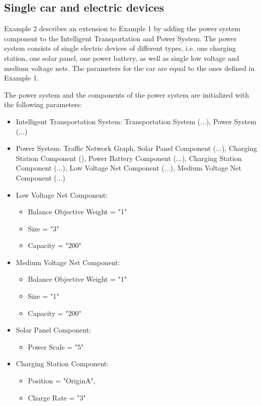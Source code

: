 \subsection{Single car and electric devices}
Example 2 describes an extension to Example 1 by adding the power system component to the Intelligent Transportation and Power System. The power system consists of single electric devices of different types, i.e. one charging station, one solar panel, one power battery, as well as single low voltage and medium voltage nets. The parameters for the car are equal to the ones defined in Example 1.

The power system and the components of the power system are initialized with the following parameters:

\begin{itemize}
	\item Intelligent Transportation System: Transportation System (...), Power System (...)
	\item Power System: Traffic Network Graph, Solar Panel Component (...), Charging Station Component (), Power Battery Component (...), Charging Station Component (...), Low Voltage Net Component (...), Medium Voltage Net Component (...)
	
	\item Low Voltage Net Component:
	\begin{itemize}  
		\item Balance Objective Weight = "1"
		\item Size = "3"
		\item Capacity = "200"
	\end{itemize}
	
	\item Medium Voltage Net Component:
	\begin{itemize}  
		\item Balance Objective Weight = "1"
		\item Size = "1"
		\item Capacity = "200"
	\end{itemize}
	
	\item Solar Panel Component:
	\begin{itemize}
		\item Power Scale = "5"
	\end{itemize}	
	
	\item Charging Station Component:
	\begin{itemize}
		\item Position = "OriginA", 
		\item Charge Rate = "3"
	\end{itemize}
	

\end{itemize}
